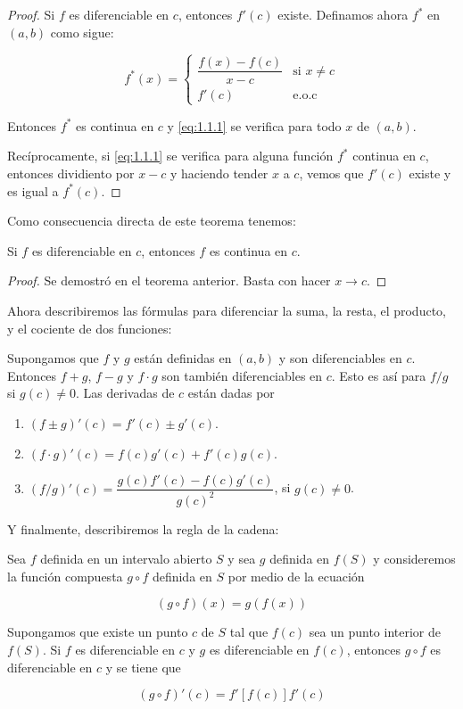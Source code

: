 \begin{proof}
    Si $f$ es diferenciable en $c$, entonces $f'(c)$ existe. Definamos ahora $f^*$  en $(a, b)$ como sigue:
    
    \[
    f^*(x) = 
    \begin{cases}
        \dfrac{f(x) - f(c)}{x-c} & \text{si $x \neq c$} \\
        f'(c) & \text{e.o.c}
    \end{cases}
    \]
    
    Entonces $f^*$ es continua en $c$ y \ref{eq:1.1.1} se verifica para todo $x$ de $(a, b)$.
    
    Recíprocamente, si \ref{eq:1.1.1} se verifica para alguna función $f^*$ continua en $c$, entonces dividiento por $x-c$ y haciendo tender $x$ a $c$, vemos que $f'(c)$ existe y es igual a $f^*(c)$.
\end{proof}

Como consecuencia directa de este teorema tenemos:

\begin{teo}
    Si $f$ es diferenciable en $c$, entonces $f$ es continua en $c$.
\end{teo}

\begin{proof}
    Se demostró en el teorema anterior. Basta con hacer $x \to c$.
\end{proof}

Ahora describiremos las fórmulas para diferenciar la suma, la resta, el producto, y el cociente de dos funciones:

\begin{teo}
    Supongamos que $f$ y $g$ están definidas en $(a, b)$ y son diferenciables en $c$. Entonces $f+g$, $f-g$ y $f \cdot g$ son también diferenciables en $c$. Esto es así para $f / g$ si $g(c) \neq 0$. Las derivadas de $c$ están dadas por
    
    \begin{enumerate}
        \item $(f \pm g)'(c) = f'(c) \pm g'(c)$.
        \item $(f \cdot g)'(c) = f(c)g'(c) + f'(c)g(c)$.
        \item $(f/g)'(c) = \dfrac{g(c)f'(c) - f(c)g'(c)}{g(c)^2}$, si $g(c) \neq 0$.
    \end{enumerate}
\end{teo}

Y finalmente, describiremos la regla de la cadena:

\begin{teo}
    Sea $f$ definida en un intervalo abierto $S$ y sea $g$ definida en $f(S)$ y consideremos la función compuesta $g \circ f$ definida en $S$ por medio de la ecuación
    
    \[
    (g \circ f)(x) = g(f(x))
    \]
    
    Supongamos que existe un punto $c$ de $S$ tal que $f(c)$ sea un punto interior de $f(S)$. Si $f$ es diferenciable en $c$ y $g$ es diferenciable en $f(c)$, entonces $g \circ f$ es diferenciable en $c$ y se tiene que
    
    \[
    (g \circ f)'(c) = f'[f(c)]f'(c)
    \]
\end{teo}

